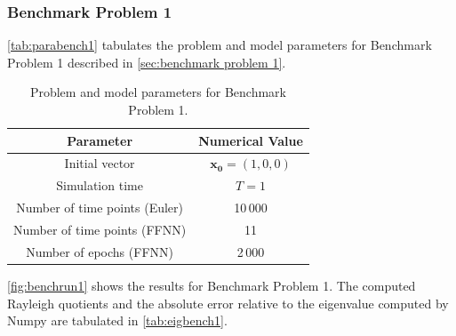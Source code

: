 \subsubsection{Benchmark Problem 1}

\autoref{tab:parabench1} tabulates the problem and model parameters for Benchmark Problem 1 described in \autoref{sec:benchmark problem 1}. 

\begin{table}[H]
\caption{Problem and model parameters for Benchmark Problem 1.}
\centering
{}
\begin{tabular}{c|c}
\hline
\hline 
Parameter & Numerical Value
\\
\hline 
\hline 
Initial vector & $\bm{x_0}=(1,0,0)$
\\
Simulation time & $T=1$
\\
Number of time points (Euler) & 10\,000
\\
Number of time points (FFNN) & 11
\\
Number of epochs (FFNN) & 2\,000
\\
\hline
\hline 
\end{tabular}
\label{tab:parabench1}
\end{table}


\autoref{fig:benchrun1} shows the results for Benchmark Problem 1. The computed Rayleigh quotients and the absolute error relative to the eigenvalue computed by Numpy are tabulated in \autoref{tab:eigbench1}. 

